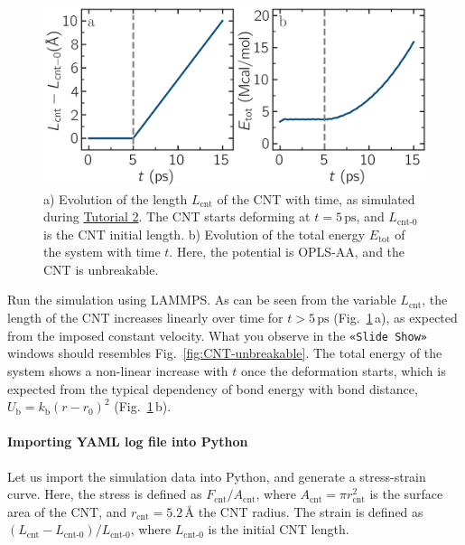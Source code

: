 \documentclass[9pt,tutorial]{livecoms}
\newcommand{\guicmd}[1]{\textcolor{command}{\texttt{«#1»}}} %
\begin{document}
\begin{figure}
\centering
\includegraphics[width=\linewidth]{CNT-unbreakable-length-energy}
\caption{a) Evolution of the length $L_\text{cnt}$ of the CNT with time,
as simulated during \hyperref[carbon-nanotube-label]{Tutorial 2}.
The CNT starts deforming at $t = 5\,\text{ps}$, and $L_\text{cnt-0}$ is the
CNT initial length.  b) Evolution of the total energy $E_\text{tot}$ of the system
with time $t$.  Here, the potential is OPLS-AA, and the CNT is unbreakable.}
\label{fig:CNT-unbreakable-LE}
\end{figure}

Run the simulation using LAMMPS.  As can be seen from the variable $L_\text{cnt}$, the length
of the CNT increases linearly over time for $t > 5\,\text{ps}$ (Fig.~\ref{fig:CNT-unbreakable-LE}\,a),
as expected from the imposed constant velocity.  What you observe in the \guicmd{Slide Show}
windows should resembles Fig.~\ref{fig:CNT-unbreakable}.  The total energy of the system
shows a non-linear increase with $t$ once the deformation starts, which is expected
from the typical dependency of bond energy with bond distance,
$U_\text{b} = k_\text{b} \left( r - r_0 \right)^2$ (Fig.~\ref{fig:CNT-unbreakable-LE}\,b).

\paragraph{Importing YAML log file into Python}

Let us import the simulation data into Python, and generate a stress-strain curve.
Here, the stress is defined as $F_\text{cnt}/A_\text{cnt}$,
where $A_\text{cnt} = \pi r_\text{cnt}^2$ is the surface area of the
CNT, and $r_\text{cnt}=5.2$\,\AA{} the CNT radius.  The strain is defined
as $(L_\text{cnt}-L_\text{cnt-0})/L_\text{cnt-0}$, where $L_\text{cnt-0}$ is the initial CNT length.
\end{document}
